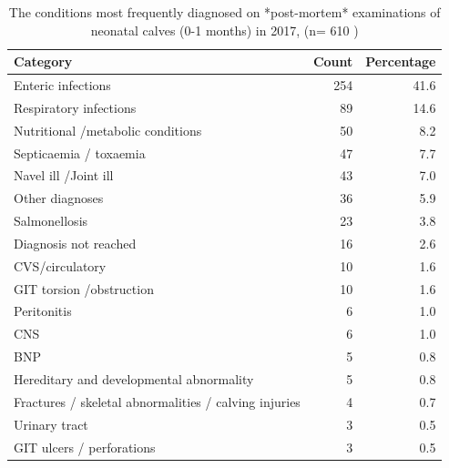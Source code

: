 \documentclass[]{book}
\begin{document}
\begin{table}

\caption{\label{tab:unnamed-chunk-6}The conditions most frequently diagnosed on *post-mortem* examinations of  neonatal calves (0-1 months) in 2017, (n= 610 )}
\centering
\begin{tabular}[t]{l|r|r}
\hline
Category & Count & Percentage\\
\hline
Enteric infections & 254 & 41.6\\
\hline
Respiratory infections & 89 & 14.6\\
\hline
Nutritional /metabolic conditions & 50 & 8.2\\
\hline
Septicaemia / toxaemia & 47 & 7.7\\
\hline
Navel ill /Joint ill & 43 & 7.0\\
\hline
Other diagnoses & 36 & 5.9\\
\hline
Salmonellosis & 23 & 3.8\\
\hline
Diagnosis not reached & 16 & 2.6\\
\hline
CVS/circulatory & 10 & 1.6\\
\hline
GIT torsion /obstruction & 10 & 1.6\\
\hline
Peritonitis & 6 & 1.0\\
\hline
CNS & 6 & 1.0\\
\hline
BNP & 5 & 0.8\\
\hline
Hereditary and developmental abnormality & 5 & 0.8\\
\hline
Fractures / skeletal abnormalities / calving injuries & 4 & 0.7\\
\hline
Urinary tract & 3 & 0.5\\
\hline
GIT ulcers / perforations & 3 & 0.5\\
\hline
\end{tabular}
\end{table}
\end{document}
